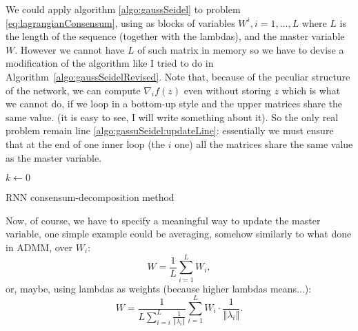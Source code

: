 \documentclass{article}
\newcommand{\norm}[1]{\left\Vert #1 \right\Vert}
\begin{document}
We could apply algorithm \ref{algo:gaussSeidel} to problem \ref{eq:lagrangianConsensum}, using as blocks of variables $W^i, i=1,...,L$ where $L$ is the length of the sequence (together with the lambdas), and the master variable $W$.
However we cannot have $L$ of such matrix in memory so we have to devise a modification of the algorithm like I tried to do in Algorithm~\ref{algo:gaussSeidelRevised}. Note that, because of the peculiar structure of the network, we can compute $\nabla_i f(z)$ even without storing $z$ which is what we cannot do, if we loop in a bottom-up style and the upper matrices share the same value. (it is easy to see, I will write something about it). So the only real problem remain line \ref{algo:gassuSeidel:updateLine}: essentially we must ensure that at the end of one inner loop (the $i$ one) all the matrices share the same value as the master variable.


\begin{algorithm}[!h]
	$k \gets 0$\\
	\caption{RNN consensum-decomposition method}
	\label{algo:gaussSeidelRevised}
\end{algorithm}

Now, of course, we have to specify a meaningful way to update the master variable, one simple example could be averaging, somehow similarly to what done in ADMM, over $W_i$:
\begin{equation}
W=\frac{1}{L}\sum_{i=1}^{L}W_i,
\end{equation}
or, maybe, using lambdas as weights (because higher lambdas means...):
\begin{equation}
W=\frac{1}{L\sum_{i=i}^{L} \frac{1}{\norm{\lambda_i}}}\sum_{i=1}^{L}W_i\cdot \frac{1}{\norm{\lambda_i}}.
\end{equation}
\end{document}
